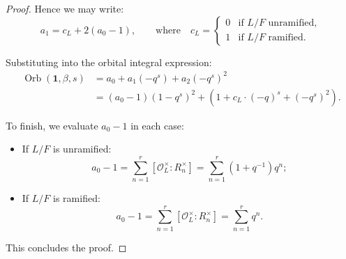 \documentclass[10pt,a4paper]{amsart}
\newcommand{\CO}{\mathcal{O}}
\newcommand{\Orb}{\operatorname{Orb}}
\begin{document}
\begin{proof}
Hence we may write:
$$
a_1 = c_L + 2(a_0 - 1), \qquad \text{where} \quad
c_L =
\begin{cases}
0 & \text{if $L/F$ unramified}, \\
1 & \text{if $L/F$ ramified}.
\end{cases}
$$

Substituting into the orbital integral expression:
\begin{align*}
\Orb(\mathbf{1}, \beta, s)
&= a_0 + a_1(-q^s) + a_2(-q^s)^2 \\
&= (a_0 - 1)(1 - q^s)^2 + \left(1 + c_L \cdot (-q)^s + (-q^s)^2\right).
\end{align*}

To finish, we evaluate $a_0 - 1$ in each case:
\begin{itemize}
\item If $L/F$ is unramified:
$$
a_0 - 1 = \sum_{n=1}^r \left[\CO_L^\times : R_n^\times\right] = \sum_{n=1}^r (1 + q^{-1}) q^n;
$$
\item If $L/F$ is ramified:
$$
a_0 - 1 = \sum_{n=1}^r \left[\CO_L^\times : R_n^\times\right] = \sum_{n=1}^r q^n.
$$
\end{itemize}

This concludes the proof.
\end{proof}
\end{document}
